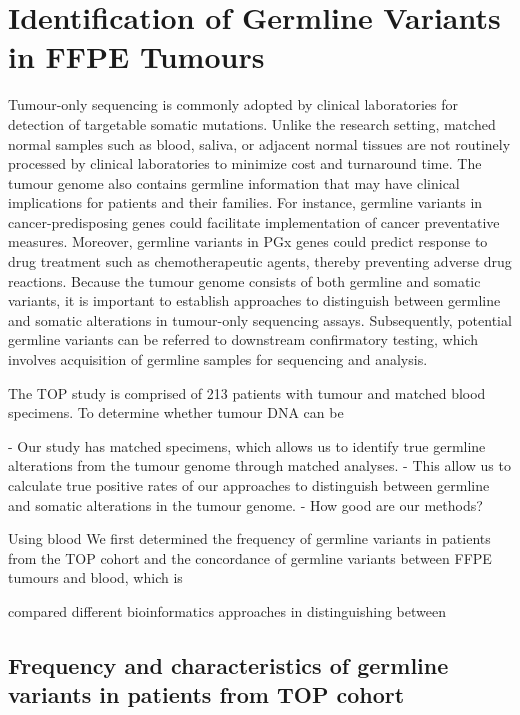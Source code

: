 
\chapter{Identification of Germline Variants in FFPE Tumours}
\label{ch:IdentificationofGermlineVariantsinFFPETumours}

Tumour-only sequencing is commonly adopted by clinical laboratories for detection of targetable somatic mutations. Unlike the research setting, matched normal samples such as blood, saliva, or adjacent normal tissues are not routinely processed by clinical laboratories to minimize cost and turnaround time. The tumour genome also contains germline information that may have clinical implications for patients and their families. For instance, germline variants in cancer-predisposing genes could facilitate implementation of cancer preventative measures. Moreover, germline variants in PGx genes could predict response to drug treatment such as chemotherapeutic agents, thereby preventing adverse drug reactions. Because the tumour genome consists of both germline and somatic variants, it is important to establish approaches to distinguish between germline and somatic alterations in tumour-only sequencing assays. Subsequently, potential germline variants can be referred to downstream confirmatory testing, which involves acquisition of germline samples for sequencing and analysis.

The TOP study is comprised of 213 patients with tumour and matched blood specimens. To determine whether tumour DNA can be

- Our study has matched specimens, which allows us to identify true germline alterations from the tumour genome through matched analyses.
- This allow us to calculate true positive rates of our approaches to distinguish between germline and somatic alterations in the tumour genome.
-  How good are our methods?

Using blood We first determined the frequency of germline variants in patients from the TOP cohort and the concordance of germline variants between FFPE tumours and blood, which is

compared different bioinformatics approaches in distinguishing between

\section{Frequency and characteristics of germline variants in patients from TOP cohort}
\label{sec:FrequencyandcharacteristicsofgermlinevariantsinpatientsfromTOPcohort}

